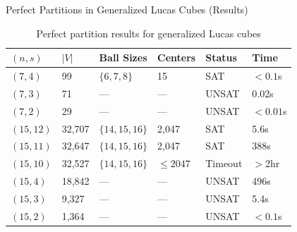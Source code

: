 \documentclass[10pt, aspectratio=169]{beamer}
\begin{document}
\begin{frame}{Perfect Partitions in Generalized Lucas Cubes (Results)}
    \begin{table}[htbp]
    \centering
    \caption{Perfect partition results for generalized Lucas cubes}
    \begin{tabular}{llllll}
    \toprule
    $(n, s)$ & $|V|$ & Ball Sizes & Centers & Status & Time \\
    \midrule
    $(7, 4)$ & 99 & $\{6, 7, 8\}$ & 15 & SAT & $<0.1$s \\
    $(7, 3)$ & 71 & --- & --- & UNSAT & 0.02s \\
    $(7, 2)$ & 29 & --- & --- & UNSAT & $<0.01$s \\
    $(15, 12)$ & 32,707 & $\{14, 15, 16\}$ & 2,047 & SAT & 5.6s \\
    $(15, 11)$ & 32,647 & $\{14, 15, 16\}$ & 2,047 & SAT & 388s \\
    $(15, 10)$ & 32,527 & $\{14, 15, 16\}$ & $\le 2047$ & Timeout & $>$2hr \\
    $(15, 4)$ & 18,842 & --- & --- & UNSAT & 496s \\
    $(15, 3)$ & 9,327 & --- & --- & UNSAT & 5.4s \\
    $(15, 2)$ & 1,364 & --- & --- & UNSAT & $<0.1$s \\
    \bottomrule
    \end{tabular}
    \end{table}
\end{frame}
\end{document}
